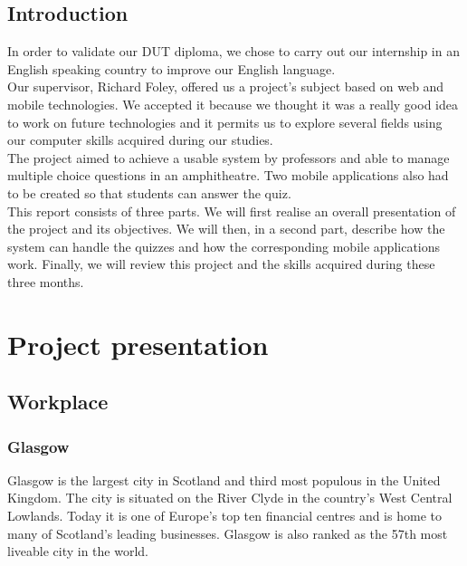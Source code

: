 \documentclass{scrreprt}
\begin{document}
		  \chapter*{Introduction} %
		  In order to validate our DUT diploma, we chose to carry out our internship in an
		  English speaking country to improve our English language.\\

		  Our supervisor, Richard Foley, offered us a project's subject based on web and mobile
		  technologies. We accepted it because we thought it was a really good idea to work on future
		  technologies and it permits us to explore several fields using our computer skills acquired
		  during our studies.\\

		  The project aimed to achieve a usable system by professors and able to manage
		  multiple choice questions in an amphitheatre. Two mobile applications also had to be
		  created so that students can answer the quiz.\\

		  This report consists of three parts. We will first realise an overall presentation of the
		  project and its objectives. We will then, in a second part, describe how the system can
		  handle the quizzes and how the corresponding mobile applications work. Finally, we will
		  review this project and the skills acquired during these three months.

		  \renewcommand{\contentsname}{Summary}
		  \tableofcontents

		  \part{Project presentation}
		  \chapter{Workplace}
		  \section{Glasgow}%
		  Glasgow is the largest city in Scotland and third most populous in the United
		  Kingdom. The city is situated on the River Clyde in the country's West Central Lowlands.
		  Today it is one of Europe's top ten financial centres and is home to many of
		  Scotland's leading businesses. Glasgow is also ranked as the 57th most liveable city in the
		  world.\\
\end{document}
